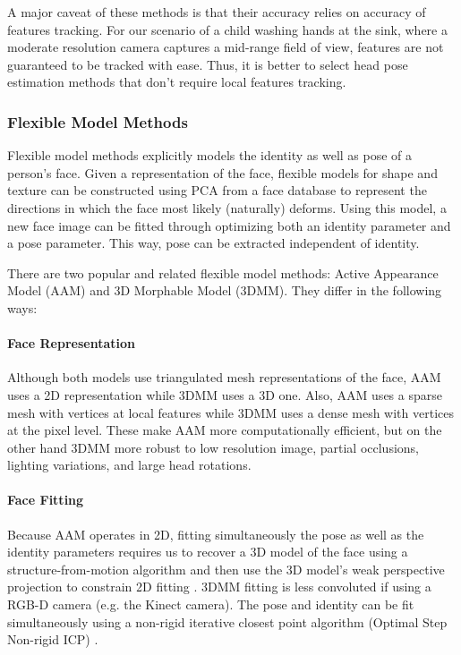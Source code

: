 A major caveat of these methods is that their accuracy relies on accuracy of features tracking.  For our scenario of a child washing hands at the sink, where a moderate resolution camera captures a mid-range field of view, features are not guaranteed to be tracked with ease.  Thus, it is better to select head pose estimation methods that don't require local features tracking.


\subsubsection{Flexible Model Methods}
Flexible model methods explicitly models the identity as well as pose of a person's face.  Given a representation of the face, flexible models for shape and texture can be constructed using PCA from a face database to represent the directions in which the face most likely (naturally) deforms.  Using this model, a new face image can be fitted through optimizing both an identity parameter and a pose parameter.  This way, pose can be extracted independent of identity.


There are two popular and related flexible model methods: Active Appearance Model (AAM) and 3D Morphable Model (3DMM).  They differ in the following ways:

\paragraph{Face Representation}
Although both models use triangulated mesh representations of the face, AAM uses a 2D representation while 3DMM uses a 3D one.  Also, AAM uses a sparse mesh with vertices at local features while 3DMM uses a dense mesh with vertices at the pixel level.  These make AAM more computationally efficient, but on the other hand 3DMM more robust to low resolution image, partial occlusions, lighting variations, and large head rotations.


\paragraph{Face Fitting}
Because AAM operates in 2D, fitting simultaneously the pose as well as the identity parameters requires us to recover a 3D model of the face using a structure-from-motion algorithm and then use the 3D model's weak perspective projection to constrain 2D fitting \cite{xiao2004real}.  3DMM fitting is less convoluted if using a RGB-D camera (e.g. the Kinect camera).  The pose and identity can be fit simultaneously using a non-rigid iterative closest point algorithm (Optimal Step Non-rigid ICP) \cite{paysan20093d}.

